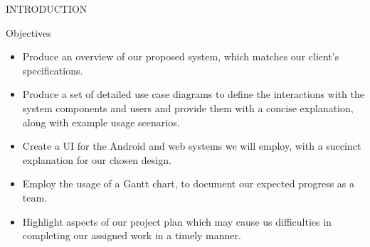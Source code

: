 \documentclass{article}
\begin{document}
\begin{section}{INTRODUCTION}
\begin{subsection}{Objectives}
			\begin{itemize}
				\item{Produce an overview of our proposed system, which matches our client's specifications.}
				\item{Produce a set of detailed use case diagrams to define the interactions with the system components and users and provide them with a concise explanation, along with example usage scenarios.}
				\item{Create a UI for the Android and web systems we will employ, with a succinct explanation for our chosen design.}
				\item{Employ the usage of a Gantt chart, to document our expected progress as a team.}
				\item{Highlight aspects of our project plan which may cause us difficulties in completing our assigned work in a timely manner.}
			\end{itemize}
		\end{subsection}
	\end{section}
\end{document}
